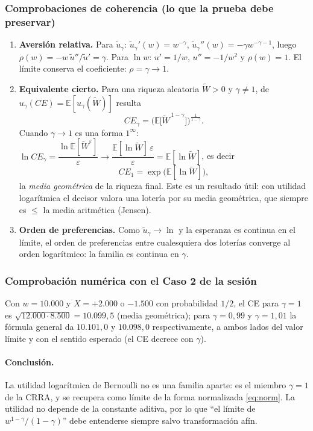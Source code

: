 \documentclass[a4paper,12pt]{article}
\newcommand{\E}{\mathbb{E}}
\begin{document}
\subsubsection*{Comprobaciones de coherencia (lo que la prueba debe preservar)}
\begin{enumerate}[leftmargin=*]
\item \textbf{Aversi\'on relativa.} Para $\tilde u_\gamma$: $\tilde u_\gamma'(w)=w^{-\gamma}$, $\tilde u_\gamma''(w)=-\gamma w^{-\gamma-1}$, luego $\rho(w)=-w\,\tilde u''/\tilde u'=\gamma$. Para $\ln w$: $u'=1/w$, $u''=-1/w^2$ y $\rho(w)=1$. El l\'imite conserva el coeficiente: $\rho=\gamma\to1$.
\item \textbf{Equivalente cierto.} Para una riqueza aleatoria $\widetilde W>0$ y $\gamma\neq1$, de $u_\gamma(CE)=\E[u_\gamma(\widetilde W)]$ resulta
\[CE_\gamma=\Big(\E\big[\widetilde W^{\,1-\gamma}\big]\Big)^{\frac1{1-\gamma}}.\]
Cuando $\gamma\to1$ es una forma $1^\infty$: $\ln CE_\gamma=\dfrac{\ln \E[\widetilde W^{\varepsilon}]}{\varepsilon}\to\dfrac{\E[\ln\widetilde W]\,\varepsilon}{\varepsilon}=\E[\ln\widetilde W]$, es decir
\[CE_1=\exp\big(\E[\ln\widetilde W]\big),\]
la \emph{media geom\'etrica} de la riqueza final. Este es un resultado \'util: con utilidad logar\'itmica el decisor valora una lotería por su media geom\'etrica, que siempre es $\le$ la media aritm\'etica (Jensen).
\item \textbf{Orden de preferencias.} Como $\tilde u_\gamma\to\ln$ y la esperanza es continua en el l\'imite, el orden de preferencias entre cualesquiera dos loter\'ias converge al orden logar\'itmico: la familia es continua en $\gamma$.
\end{enumerate}

\subsubsection*{Comprobaci\'on num\'erica con el Caso 2 de la sesi\'on}
Con $w=10.000$ y $X=+2.000$ o $-1.500$ con probabilidad $1/2$, el CE para $\gamma=1$ es $\sqrt{12.000\cdot8.500}=10.099{,}5$ (media geom\'etrica); para $\gamma=0{,}99$ y $\gamma=1{,}01$ la f\'ormula general da $10.101{,}0$ y $10.098{,}0$ respectivamente, a ambos lados del valor l\'imite y con el sentido esperado (el CE decrece con $\gamma$).

\paragraph{Conclusi\'on.} La utilidad logar\'itmica de Bernoulli no es una familia aparte: es el miembro $\gamma=1$ de la CRRA, y se recupera como l\'imite de la forma normalizada \eqref{eq:norm}. La utilidad no depende de la constante aditiva, por lo que ``el l\'imite de $w^{1-\gamma}/(1-\gamma)$'' debe entenderse siempre salvo transformaci\'on af\'in.
\end{document}
